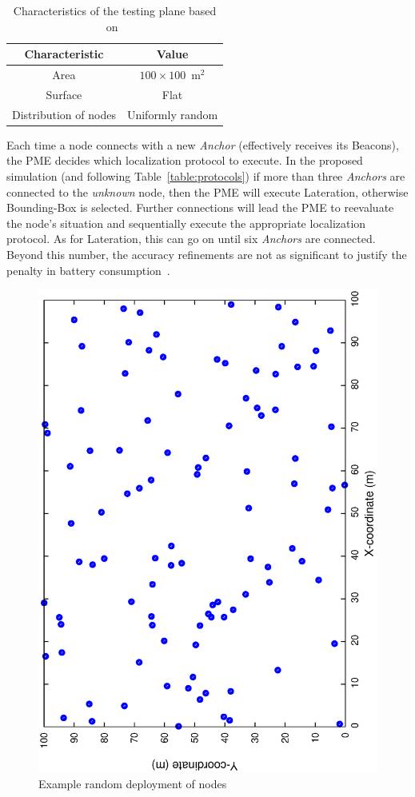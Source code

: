 
\begin{table}[tb]
  \centering
  \begin{threeparttable}[t]
  \caption{Characteristics of the testing plane based on~\cite{convexEstimation,fieldDimmensions}}
  \label{tab:testingPlanes}
  \begin{tabular}{c||c}
  \hline
  \bfseries Characteristic & \bfseries Value\\
  \hline\hline
  Area & $100\times100$~m$^{2}$\\
  Surface & Flat\\
  Distribution of nodes & Uniformly random\\
  \hline
  \end{tabular}
  \end{threeparttable} 
\end{table}

Each time a node connects with a new \emph{Anchor} (effectively receives its Beacons), the PME decides which localization protocol to execute. In the proposed simulation (and following Table~\ref{table:protocols}) if more than three \emph{Anchors} are connected to the \emph{unknown} node, then the PME will execute Lateration, otherwise Bounding-Box is selected. Further connections will lead the PME to reevaluate the node's situation and sequentially execute the appropriate localization protocol. As for Lateration, this can go on until six \emph{Anchors} are connected. Beyond this number, the accuracy refinements are not as significant to justify the penalty in battery consumption~\cite{beaconLimits}.

\begin{figure}[tb]
  \centering
  \includegraphics[width=0.7\linewidth, angle = -90]{section4/figures/topology.eps}
  \caption{Example random deployment of nodes
  \label{fig:topology}}
\end{figure}

